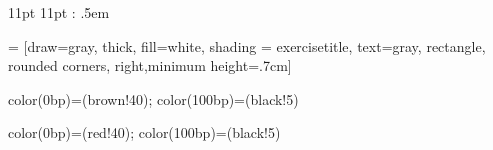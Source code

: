 
\usepackage{amsthm}                       %

\makeatletter
  {11pt}%
  {11pt}%
  {}%
  {}%
  {\scshape}%
  {:}%
  {.5em}%
  {}%
\makeatother

\theoremstyle{classicdef}
\newtheorem{theorem}{Theorem}[chapter]
\newtheorem{lemma}{Lemma}[chapter]
\newtheorem{definition}{Definition}[chapter]
\newtheorem*{homework}{Homework}
\theoremstyle{remark}
\newtheorem*{remark}{Remark}
\renewcommand{\qedsymbol}{\rule{.5em}{.5em}}


\usepackage[framemethod=TikZ]{mdframed}

 =
          [draw=gray, thick, fill=white, shading = exercisetitle, %
           text=gray, rectangle, rounded corners,
           right,minimum height=.7cm]

\usetikzlibrary{shadows}

{color(0bp)=(brown!40);
color(100bp)=(black!5)}

{color(0bp)=(red!40);
color(100bp)=(black!5)}

\makeatletter


